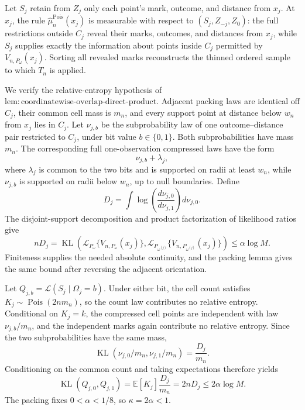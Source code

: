 Let \(S_j\) retain from \(Z_j\) only each point's mark, outcome, and distance from \(x_j\).  At \(x_j\), the rule \(\widehat\mu_n^{\mathrm{Pois}}(x_j)\) is measurable with respect to \((S_j,Z_{-j},Z_0)\): the full restrictions outside \(C_j\) reveal their marks, outcomes, and distances from \(x_j\), while \(S_j\) supplies exactly the information about points inside \(C_j\) permitted by \(V_{n,P_\omega}(x_j)\).  Sorting all revealed marks reconstructs the thinned ordered sample to which \(T_n\) is applied.

We verify the relative-entropy hypothesis of \(\mathrm{lem:coordinatewise\text{-}overlap\text{-}direct\text{-}product}\).  Adjacent packing laws are identical off \(C_j\), their common cell mass is \(m_n\), and every support point at distance below \(w_n\) from \(x_j\) lies in \(C_j\).  Let \(\nu_{j,b}\) be the subprobability law of one outcome--distance pair restricted to \(C_j\), under bit value \(b\in\{0,1\}\).  Both subprobabilities have mass \(m_n\).  The corresponding full one-observation compressed laws have the form
\[
 \nu_{j,b}+\lambda_j,
\]
where \(\lambda_j\) is common to the two bits and is supported on radii at least \(w_n\), while \(\nu_{j,b}\) is supported on radii below \(w_n\), up to null boundaries.  Define
\[
 D_j=\int\log\!\left(\frac{d\nu_{j,0}}{d\nu_{j,1}}\right)d\nu_{j,0}.
\]
The disjoint-support decomposition and product factorization of likelihood ratios give
\[
 nD_j
 =\operatorname{KL}\!\left(
 \mathcal L_{P_\omega}\{V_{n,P_\omega}(x_j)\},
 \mathcal L_{P_{\omega^{(j)}}}\{V_{n,P_{\omega^{(j)}}}(x_j)\}
 \right)
 \leq\alpha\log M.
\]
Finiteness supplies the needed absolute continuity, and the packing lemma gives the same bound after reversing the adjacent orientation.

Let \(Q_{j,b}=\mathcal L(S_j\mid\Omega_j=b)\).  Under either bit, the cell count satisfies \(K_j\sim\operatorname{Pois}(2nm_n)\), so the count law contributes no relative entropy.  Conditional on \(K_j=k\), the compressed cell points are independent with law \(\nu_{j,b}/m_n\), and the independent marks again contribute no relative entropy.  Since the two subprobabilities have the same mass,
\[
 \operatorname{KL}(\nu_{j,0}/m_n,\nu_{j,1}/m_n)=\frac{D_j}{m_n}.
\]
Conditioning on the common count and taking expectations therefore yields
\[
 \operatorname{KL}(Q_{j,0},Q_{j,1})
 =\mathbb E[K_j]\frac{D_j}{m_n}
 =2nD_j
 \leq2\alpha\log M.
\]
The packing fixes \(0<\alpha<1/8\), so \(\kappa=2\alpha<1\).

